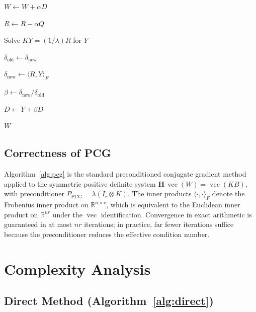 \documentclass[12pt]{article}
\theoremstyle{definition}
\DeclareMathOperator{\vecop}{vec}
\begin{document}
\begin{algorithm}
\begin{algorithmic}[1]
    \State $W \leftarrow W + \alpha D$

    \State $R \leftarrow R - \alpha Q$

    \State Solve $K Y = (1/\lambda) R$ for $Y$

    \State $\delta_{\mathrm{old}} \leftarrow \delta_{\mathrm{new}}$

    \State $\delta_{\mathrm{new}} \leftarrow \langle R, Y \rangle_F$

    \State $\beta \leftarrow \delta_{\mathrm{new}} / \delta_{\mathrm{old}}$

    \State $D \leftarrow Y + \beta D$

  \EndFor

  \State \Return $W$
\end{algorithmic}
\end{algorithm}

\subsection{Correctness of PCG}

Algorithm~\ref{alg:pcg} is the standard preconditioned conjugate gradient method applied to the
symmetric positive definite system $\mathbf{H}\,\vecop(W) = \vecop(KB)$, with preconditioner
$P_{\mathrm{PCG}} = \lambda(I_r \otimes K)$.  The inner products $\langle \cdot, \cdot \rangle_F$
denote the Frobenius inner product on $\mathbb{R}^{n \times r}$, which is equivalent to the
Euclidean inner product on $\mathbb{R}^{nr}$ under the $\vecop$ identification.  Convergence in
exact arithmetic is guaranteed in at most $nr$ iterations; in practice, far fewer iterations
suffice because the preconditioner reduces the effective condition number.

\section{Complexity Analysis}

\subsection{Direct Method (Algorithm~\ref{alg:direct})}
\end{document}
